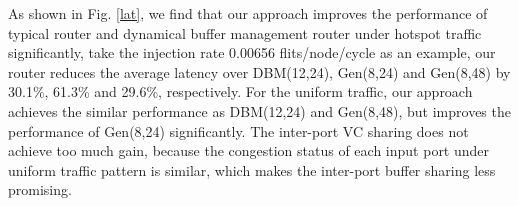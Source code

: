 \documentclass[10pt,conference]{IEEEtran}
\begin{document}
As shown in Fig. \ref{lat}, we find that our approach improves the performance of typical router and dynamical buffer management router under hotspot traffic significantly, take the injection rate 0.00656 flits/node/cycle as an example, our router reduces the average latency over DBM(12,24), Gen(8,24) and Gen(8,48) by 30.1\%, 61.3\% and 29.6\%, respectively. For the uniform traffic, our approach achieves the similar performance as DBM(12,24) and Gen(8,48), but improves the performance of Gen(8,24) significantly. The inter-port VC sharing does not achieve too much gain, because the congestion status of each input port under uniform traffic pattern is similar, which makes the inter-port buffer sharing less promising.

\end{document}
